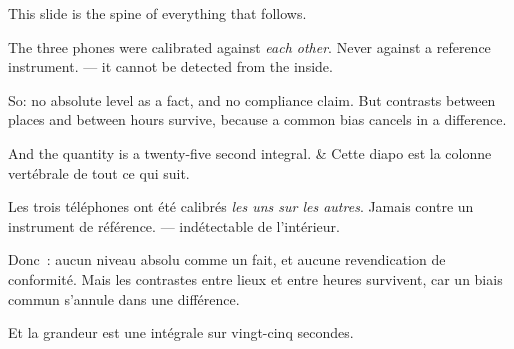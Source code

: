 \documentclass[10pt,a4paper]{article}
\begin{document}
\begin{say}
This slide is the spine of everything that follows.

The three phones were calibrated against \emph{each other}. Never against a
reference instrument.  --- it cannot be detected from the inside.

So: no absolute level as a fact, and no compliance claim. But contrasts between
places and between hours survive, because a common bias cancels in a difference.

And the quantity is a twenty-five second integral. 
&
Cette diapo est la colonne vertébrale de tout ce qui suit.

Les trois téléphones ont été calibrés \emph{les uns sur les autres}. Jamais contre
un instrument de référence.  --- indétectable de l'intérieur.

Donc~: aucun niveau absolu comme un fait, et aucune revendication de conformité.
Mais les contrastes entre lieux et entre heures survivent, car un biais commun
s'annule dans une différence.

Et la grandeur est une intégrale sur vingt-cinq secondes. 
\end{say}
\end{document}
